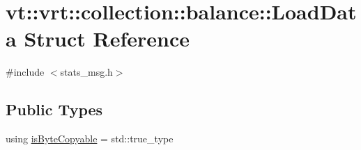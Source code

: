 \hypertarget{structvt_1_1vrt_1_1collection_1_1balance_1_1_load_data}{}\section{vt\+:\+:vrt\+:\+:collection\+:\+:balance\+:\+:Load\+Data Struct Reference}
\label{structvt_1_1vrt_1_1collection_1_1balance_1_1_load_data}


{\ttfamily \#include $<$stats\+\_\+msg.\+h$>$}

\subsection*{Public Types}
\begin{DoxyCompactItemize}
\item 
using \hyperlink{structvt_1_1vrt_1_1collection_1_1balance_1_1_load_data_aea69efe107fdadc667193683ae468105}{is\+Byte\+Copyable} = std\+::true\+\_\+type
\end{DoxyCompactItemize}
